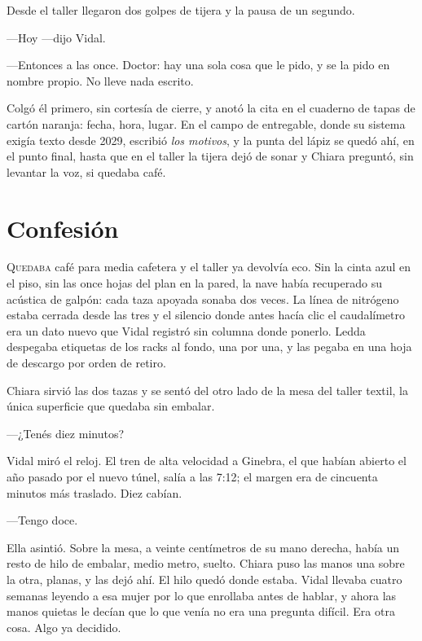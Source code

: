Desde el taller llegaron dos golpes de tijera y la pausa de un segundo.

---Hoy ---dijo Vidal.

---Entonces a las once. Doctor: hay una sola cosa que le pido, y se la pido en nombre propio. No lleve nada escrito.

Colgó él primero, sin cortesía de cierre, y anotó la cita en el cuaderno de tapas de cartón naranja: fecha, hora, lugar. En el campo de entregable, donde su sistema exigía texto desde 2029, escribió \textit{los motivos}, y la punta del lápiz se quedó ahí, en el punto final, hasta que en el taller la tijera dejó de sonar y Chiara preguntó, sin levantar la voz, si quedaba café.

\clearpage

\chapter{Confesión}

\lettrine[lines=2, lhang=0.1, nindent=0.2em]{Q}{uedaba} café para media cafetera y el taller ya devolvía eco. Sin la cinta azul en el piso, sin las once hojas del plan en la pared, la nave había recuperado su acústica de galpón: cada taza apoyada sonaba dos veces. La línea de nitrógeno estaba cerrada desde las tres y el silencio donde antes hacía clic el caudalímetro era un dato nuevo que Vidal registró sin columna donde ponerlo. Ledda despegaba etiquetas de los racks al fondo, una por una, y las pegaba en una hoja de descargo por orden de retiro.


Chiara sirvió las dos tazas y se sentó del otro lado de la mesa del taller textil, la única superficie que quedaba sin embalar.

---¿Tenés diez minutos?

Vidal miró el reloj. El tren de alta velocidad a Ginebra, el que habían abierto el año pasado por el nuevo túnel, salía a las 7:12; el margen era de cincuenta minutos más traslado. Diez cabían.

---Tengo doce.

Ella asintió. Sobre la mesa, a veinte centímetros de su mano derecha, había un resto de hilo de embalar, medio metro, suelto. Chiara puso las manos una sobre la otra, planas, y las dejó ahí. El hilo quedó donde estaba. Vidal llevaba cuatro semanas leyendo a esa mujer por lo que enrollaba antes de hablar, y ahora las manos quietas le decían que lo que venía no era una pregunta difícil. Era otra cosa. Algo ya decidido.

